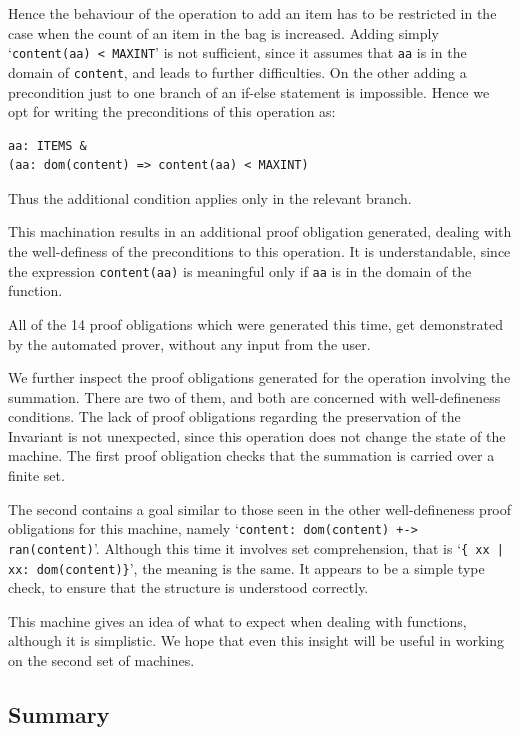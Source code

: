 \documentclass[12pt,journal,duplex]{IEEEtran}
\begin{document}
	Hence the behaviour of the operation to add an item has to be restricted in the case when the count of an item in the bag is increased. Adding simply `\texttt{content(aa) < MAXINT}' is not sufficient, since it assumes that \texttt{aa} is in the domain of \texttt{content}, and leads to further difficulties. On the other adding a precondition just to one branch of an if-else statement is impossible. Hence we opt for writing the preconditions of this operation as:
	\begin{lstlisting}
aa: ITEMS &
(aa: dom(content) => content(aa) < MAXINT)
	\end{lstlisting}
	Thus the additional condition applies only in the relevant branch.

	This machination results in an additional proof obligation generated, dealing with the well-definess of the preconditions to this operation. It is understandable, since the expression \texttt{content(aa)} is meaningful only if \texttt{aa} is in the domain of the function.

	All of the 14 proof obligations which were generated this time, get demonstrated by the automated prover, without any input from the user.

	We further inspect the proof obligations generated for the operation involving the summation. There are two of them, and both are concerned with well-defineness conditions. The lack of proof obligations regarding the preservation of the Invariant is not unexpected, since this operation does not change the state of the machine. The first proof obligation checks that the summation is carried over a finite set.

	The second contains a goal similar to those seen in the other well-defineness proof obligations for this machine, namely `\texttt{content: dom(content) +-> ran(content)}'. Although this time it involves set comprehension, that is `\texttt{\{~xx | xx: dom(content)\}}', the meaning is the same. It appears to be a simple type check, to ensure that the structure is understood correctly.

	This machine gives an idea of what to expect when dealing with functions, although it is simplistic. We hope that even this insight will be useful in working on the second set of machines.

	\subsection{Summary}
\end{document}
